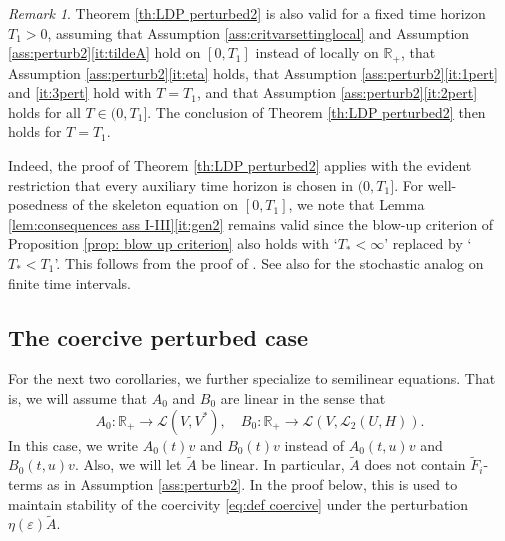 \documentclass{amsart}
\newcommand{\UH}{\mathscr{L}_2(U,H)}
\newcommand{\<}{\langle}
\newcommand{\?}{\rangle}
\newcommand{\col}{\colon}
\theoremstyle{plain}
\theoremstyle{remark}
\newtheorem{remark}[theorem]{Remark}
\theoremstyle{plain}
\numberwithin{equation}{section}
\def\R{{\mathbb R}}
\newcommand{\eps}{\varepsilon}
\begin{document}
\begin{remark}\label{rem:finite time horizon}
Theorem \ref{th:LDP perturbed2} is also valid for a fixed time horizon $T_1>0$, assuming that Assumption \ref{ass:critvarsettinglocal} and Assumption \ref{ass:perturb2}\ref{it:tildeA} hold on $[0,T_1]$ instead of locally on $\R_+$, that Assumption \ref{ass:perturb2}\ref{it:eta} holds, that Assumption \ref{ass:perturb2}\ref{it:1pert} and \ref{it:3pert} hold with $T=T_1$, and that Assumption \ref{ass:perturb2}\ref{it:2pert} holds for all $T\in(0,T_1]$.  
The conclusion of  Theorem \ref{th:LDP perturbed2} then holds for $T=T_1$. 

Indeed, the proof of Theorem \ref{th:LDP perturbed2} applies with the evident restriction that every auxiliary time horizon is chosen in $(0,T_1]$.  For well-posedness of the skeleton equation on $[0,T_1]$, we note that Lemma \ref{lem:consequences ass I-III}\ref{it:gen2} remains valid since the blow-up criterion of Proposition \ref{prop: blow up criterion} also holds with `$T_*<\infty$' replaced by `$T_*<T_1$'. This follows from the proof of \cite[Prop.\ 3.15]{TV24}. See also \cite{BGV} for the stochastic analog on finite time intervals. 
\end{remark}


\subsection{The coercive perturbed case}

For the next two corollaries, we further specialize to semilinear equations. 
That is, we will assume that $A_0$ and $B_0$ are linear in the sense that 
\begin{equation}\label{eq:semilin}
A_0\col \R_+\to \mathscr{L}(V,V^*), \quad B_0\col \R_+\to \mathscr{L}(V,\UH). 
\end{equation}
In this case, we write $A_0(t)v$ and $B_0(t)v$ instead of $A_0(t,u)v$ and $B_0(t,u)v$. 
Also, we will let $\tilde{A}$ be linear. In particular, $\tilde{A}$ does not contain $\tilde{F}_i$-terms as in Assumption \ref{ass:perturb2}.  In the proof below, this is used to maintain stability of the coercivity \eqref{eq:def coercive} under the perturbation $\eta(\eps)\tilde{A}$. 
\end{document}

